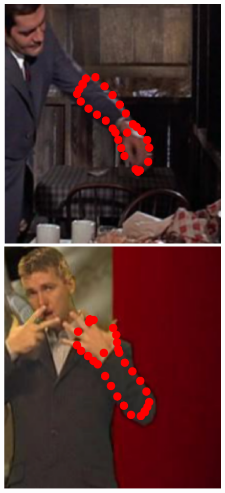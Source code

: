 \begin{figure}[!t]
    \hfill
    \includegraphics[height=\ofh]{Suplementory_Meterial/ExFit/0003.eps}
    \hfill
    \includegraphics[height=\ofh]{Suplementory_Meterial/ExFit/0004.eps}

\end{figure}
